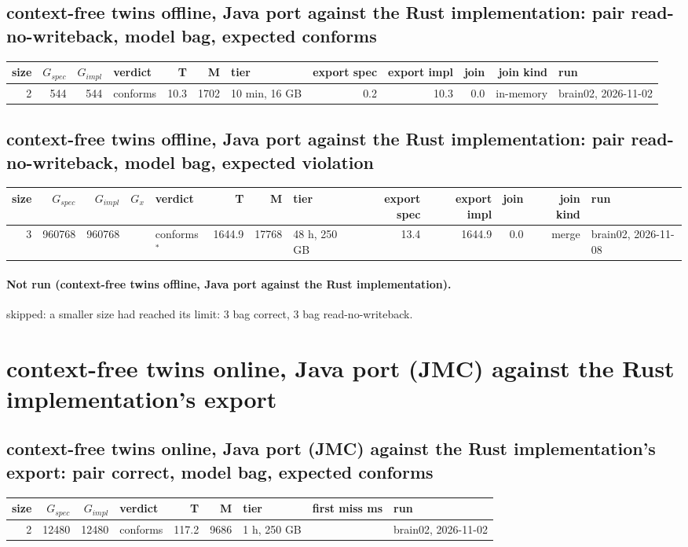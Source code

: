 \documentclass[10pt]{article}
\begin{document}
\subsection*{context-free twins offline, Java port against the Rust implementation: pair \textsf{read-no-writeback}, model bag, expected conforms}
\begin{longtable}{@{}rrrlrrlrrrrl@{}}
\toprule
size & $G_{\mathit{spec}}$ & $G_{\mathit{impl}}$ & verdict & T & M & tier & export spec & export impl & join & join kind & run \\
\midrule
\endhead
\color{red} 2 & 544 & 544 & conforms & 10.3 & 1702 & 10 min, 16 GB & 0.2 & 10.3 & 0.0 & in-memory & brain02, 2026-11-02 \\
\bottomrule
\end{longtable}
\subsection*{context-free twins offline, Java port against the Rust implementation: pair \textsf{read-no-writeback}, model bag, expected violation}
\begin{longtable}{@{}rrrrlrrlrrrrl@{}}
\toprule
size & $G_{\mathit{spec}}$ & $G_{\mathit{impl}}$ & $G_x$ & verdict & T & M & tier & export spec & export impl & join & join kind & run \\
\midrule
\endhead
\color{blue} 3 & 960768 & 960768 &  & conforms$^{\ast}$ & 1644.9 & 17768 & 48 h, 250 GB & 13.4 & 1644.9 & 0.0 & merge & brain02, 2026-11-08 \\
\bottomrule
\end{longtable}
\paragraph{Not run (context-free twins offline, Java port against the Rust implementation).}
skipped: a smaller size had reached its limit: 3 bag correct, 3 bag read-no-writeback.\par
\section*{context-free twins online, Java port (JMC) against the Rust implementation's export}
\subsection*{context-free twins online, Java port (JMC) against the Rust implementation's export: pair \textsf{correct}, model bag, expected conforms}
\begin{longtable}{@{}rrrlrrlrl@{}}
\toprule
size & $G_{\mathit{spec}}$ & $G_{\mathit{impl}}$ & verdict & T & M & tier & first miss ms & run \\
\midrule
\endhead
\color{red} 2 & 12480 & 12480 & conforms & 117.2 & 9686 & 1 h, 250 GB &  & brain02, 2026-11-02 \\
\bottomrule
\end{longtable}
\end{document}
